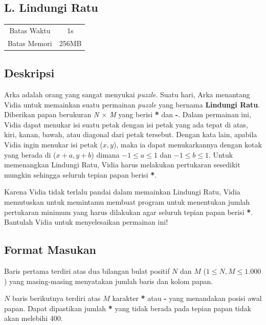 \documentclass{article}
\begin{document}
\begin{center}
    \section*{L. Lindungi Ratu} %

    \begin{tabular}{ | c c | }
        \hline
        Batas Waktu  & 1s \\    %
        Batas Memori & 256MB \\  %
        \hline
    \end{tabular}
\end{center}

\subsection*{Deskripsi}
Arka adalah orang yang sangat menyukai \textit{puzzle}. Suatu hari, Arka menantang Vidia untuk memainkan suatu permainan \textit{puzzle} yang bernama \textbf{Lindungi Ratu}. Diberikan papan berukuran \textit{N $\times$ M} yang berisi \textbf{*} dan \textbf{-}. Dalam permainan ini, Vidia dapat menukar isi suatu petak dengan isi petak yang ada tepat di atas, kiri, kanan, bawah, atau diagonal dari petak tersebut. Dengan kata lain, apabila Vidia ingin menukar isi petak ($x , y$), maka ia dapat menukarkannya dengan kotak yang berada di ($x+a, y+b$) dimana $-1 \leq a \leq 1$ dan $-1 \leq b \leq 1$.  Untuk memenangkan Lindungi Ratu, Vidia harus melakukan pertukaran sesedikit mungkin sehingga seluruh tepian papan berisi \textbf{*}. 

Karena Vidia tidak terlalu pandai dalam memainkan Lindungi Ratu, Vidia memutuskan untuk memintamu membuat program untuk menentukan jumlah pertukaran minimum yang harus dilakukan agar seluruh tepian papan berisi \textbf{*}. Bantulah Vidia untuk menyelesaikan permainan ini!

\subsection*{Format Masukan}
Baris pertama terdiri atas dua bilangan bulat positif $N$ dan $M$ ($1 \leq N, M \leq 1.000$) yang masing-masing menyatakan jumlah baris dan kolom papan.

$N$ baris berikutnya terdiri atas $M$ karakter \textbf{*} atau \textbf{-} yang menandakan posisi awal papan. Dapat dipastikan jumlah \textbf{*} yang tidak berada pada tepian papan tidak akan melebihi 400.
\end{document}
